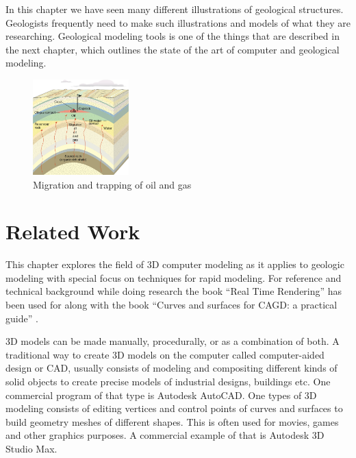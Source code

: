 \documentclass[a4paper,12pt]{report}
\begin{document}
In this chapter we have seen many different illustrations of geological structures. Geologists frequently need to make such illustrations and models of what they are researching. Geological modeling tools is one of the things that are described in the next chapter, which outlines the state of the art of computer and geological modeling.
 \begin{figure}
  
 \begin{center}
    \includegraphics[width=0.33\textwidth]{thesis/geo/english/Antiformfelle.jpg}
  \end{center}
  \caption{Migration and trapping of oil and gas}
  \label{fig:oilMigrate}
 \end{figure}




\clearpage
\chapter{Related Work}
\label{sec:star}

This chapter explores the field of 3D computer modeling as it applies to geologic modeling with special focus on techniques for rapid modeling. For reference and technical background while doing research the book ``Real Time Rendering'' \cite{moller2008real} has been used for along with the book ``Curves and surfaces for CAGD: a practical guide'' \cite{farin2001curves}.

3D models can be made manually, procedurally, or as a combination of both. A traditional way to create 3D models on the computer called computer-aided design or CAD, usually consists of modeling and compositing different kinds of solid objects to create precise models of industrial designs, buildings etc. One commercial program of that type is Autodesk AutoCAD. One types of 3D modeling consists of editing vertices and control points of curves and surfaces to build geometry meshes of different shapes. This is often used for movies, games and other graphics purposes. A commercial example of that is Autodesk 3D Studio Max.
\end{document}
